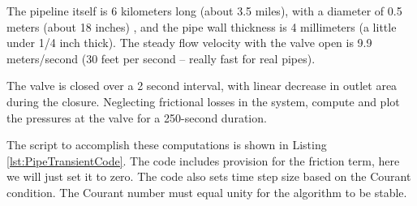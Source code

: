The pipeline itself is 6 kilometers long (about 3.5 miles), with a diameter of 0.5 meters (about 18 inches) , and the pipe wall thickness is 4 millimeters (a little under 1/4 inch thick).  The steady flow velocity with the valve open is 9.9 meters/second (30 feet per second -- really fast for real pipes).

The valve is closed over a 2 second interval, with linear decrease in outlet area during the closure.  Neglecting frictional losses in the system, compute and plot the pressures at the valve for a 250-second duration. 

The script to accomplish these computations is shown in Listing \ref{lst:PipeTransientCode}. 
The code includes provision for the friction term, here we will just set it to zero.  
The code also sets time step size based on the Courant condition.  
The Courant number must equal unity for the algorithm to be stable.  
\newpage
